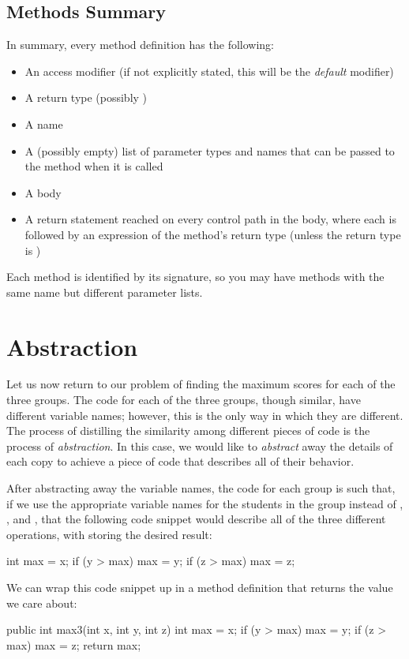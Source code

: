\subsection{Methods Summary}
In summary, every method definition has the following:
\begin{itemize}
\item An access modifier (if not explicitly stated, this will be the \emph{default} modifier)
\item A return type (possibly )
\item A name
\item A (possibly empty) list of parameter types and names that can be passed to the method when it is called
\item A body
\item A return statement reached on every control path in the body, where each  is followed by an
expression of the method's return type (unless the return type is )
\end{itemize}
Each method is identified by its signature, so you may have methods with the same name but different parameter lists.

\section{Abstraction}
Let us now return to our problem of finding the maximum scores for each
of the three groups.
The code for each of the three groups, though similar, have different variable names;
however, this is the only way in which they are different.
The process of distilling the similarity among different pieces of code is
the process of \emph{abstraction}.
In this case, we would like to \emph{abstract} away the details of
each copy to achieve a piece of code that describes all of their behavior.

After abstracting away the variable names, the code for each group is such that,
if we use the appropriate variable names for the students in the group
instead of , , and , that the following code snippet
would describe all of the three different operations, with
 storing the desired result:
\begin{code}
int max = x;
if (y > max) {
  max = y; 
}
if (z > max) {
  max = z;
}
\end{code}
We can wrap this code snippet up in a method definition
that returns the value we care about:
\begin{code}
public int max3(int x, int y, int z) {
  int max = x;
  if (y > max) {
    max = y;
  }
  if (z > max) {
    max = z;
  }
  return max;
}
\end{code}

